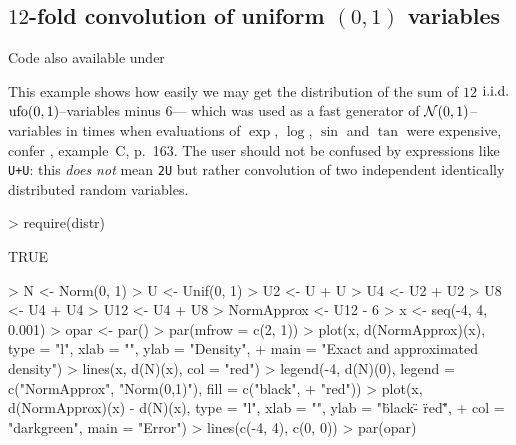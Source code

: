 \documentclass[11pt]{article}
\begin{document}
\subsection{$12$-fold convolution of uniform $(0,1)$ variables}
\begin{footnotesize}
  Code also available under\\[2ex]
\end{footnotesize}
\begin{small}
  This example shows how easily we may get the distribution of the sum of $12$
  ${\rm i.i.d.}$ ${\rm ufo}(0,1)$--variables minus $6$--- which was used as a fast generator
  of ${\cal N}(0,1)$--variables in times when evaluations of $\exp$, $\log$, $\sin$ and $\tan$ were expensive, confer
  \cite{Ric:88}, example~C, p.~163. The user should not be confused by expressions  like {\tt U+U}: this {\em does not\/} mean {\tt 2U}
  but rather convolution of two independent identically distributed random variables.
\end{small}
\begin{Schunk}
\begin{Sinput}
> require(distr)
\end{Sinput}
\begin{Soutput}
[1] TRUE
\end{Soutput}
\begin{Sinput}
> N <- Norm(0, 1)
> U <- Unif(0, 1)
> U2 <- U + U
> U4 <- U2 + U2
> U8 <- U4 + U4
> U12 <- U4 + U8
> NormApprox <- U12 - 6
> x <- seq(-4, 4, 0.001)
> opar <- par()
> par(mfrow = c(2, 1))
> plot(x, d(NormApprox)(x), type = "l", xlab = "", ylab = "Density", 
+     main = "Exact and approximated density")
> lines(x, d(N)(x), col = "red")
> legend(-4, d(N)(0), legend = c("NormApprox", "Norm(0,1)"), fill = c("black", 
+     "red"))
> plot(x, d(NormApprox)(x) - d(N)(x), type = "l", xlab = "", ylab = "\"black\" - \"red\"", 
+     col = "darkgreen", main = "Error")
> lines(c(-4, 4), c(0, 0))
> par(opar)
\end{Sinput}
\end{Schunk}
\end{document}
